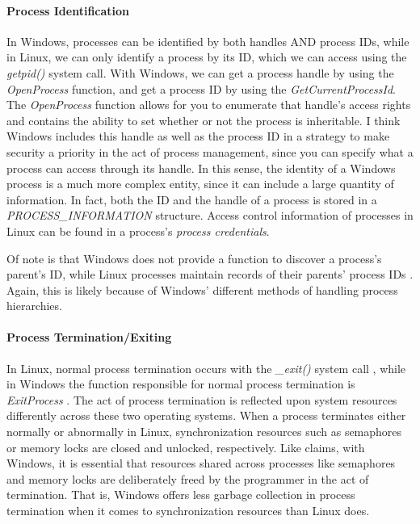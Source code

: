 \documentclass[letterpaper,10pt,titlepage]{article}
\begin{document}
\paragraph{Process Identification} In Windows, processes can be identified by both handles AND process IDs, while in Linux, we can only identify a process by its ID, which we can access using the \emph{getpid()} system call. With Windows, we can get a process handle by using the \emph{OpenProcess} function, and get a process ID by using the \emph{GetCurrentProcessId}. The \emph{OpenProcess} function allows for you to enumerate that handle's access rights and contains the ability to set whether or not the process is inheritable. I think Windows includes this handle as well as the process ID in a strategy to make security a priority in the act of process management, since you can specify what a process can access through its handle. In this sense, the identity of a Windows process is a much more complex entity, since it can include a large quantity of information. In fact, both the ID and the handle of a process is stored in a \emph{PROCESS\_INFORMATION} structure. Access control information of processes in Linux can be found in a process's \emph{process credentials}. 
\par Of note is that Windows does not provide a function to discover a process's parent's ID, while Linux processes maintain records of their parents' process IDs \cite{linux1}. Again, this is likely because of Windows' different methods of handling process hierarchies.  
\paragraph{Process Termination/Exiting}
In Linux, normal process termination occurs with the \emph{\_exit()} system call \cite{linux1}, while in Windows the function responsible for normal process termination is \emph{ExitProcess} \cite{windows2}.  The act of process termination is reflected upon system resources differently across these two operating systems. When a process terminates either normally or abnormally in Linux, synchronization resources such as semaphores or memory locks are closed and unlocked, respectively. Like \cite{windows3} claims, with Windows, it is essential that resources shared across processes like semaphores and memory locks are deliberately freed by the programmer in the act of termination. That is, Windows offers less garbage collection in process termination when it comes to synchronization resources than Linux does. 
\end{document}

